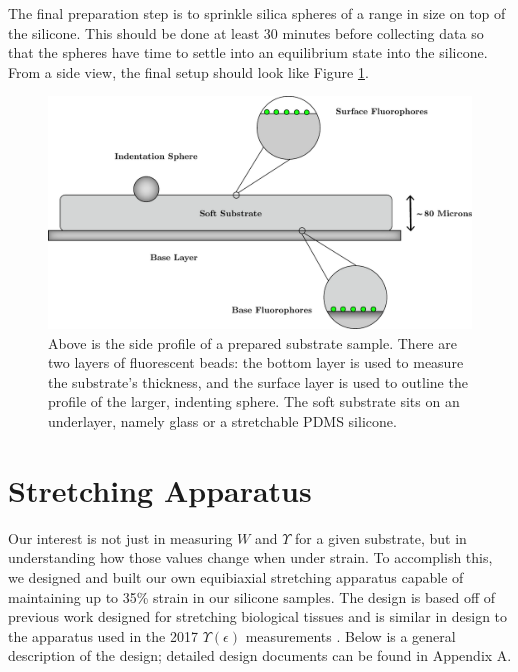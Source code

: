 The final preparation step is to sprinkle silica spheres of a range in size on top of the silicone. This should be done at least 30 minutes before collecting data so that the spheres have time to settle into an equilibrium state into the silicone. From a side view, the final setup should look like Figure \ref{fig:substrategraphic}.
\begin{figure}[h!]
	\centering
	\includegraphics[width=.85\linewidth]{Chapters/Figures/substrate_graphic_new}
	\caption[Prepared Substrate Profile]{Above is the side profile of a prepared substrate sample. There are two layers of fluorescent beads: the bottom layer is used to measure the substrate's thickness, and the surface layer is used to outline the profile of the larger, indenting sphere. The soft substrate sits on an underlayer, namely glass or a stretchable PDMS silicone.}
	\label{fig:substrategraphic}
\end{figure}


\section{Stretching Apparatus}
Our interest is not just in  measuring $W$ and $\Upsilon$ for a given substrate, but in understanding how those values change when under strain. To accomplish this, we designed and built our own equibiaxial stretching apparatus capable of maintaining up to 35\% strain in our silicone samples. The design is based off of previous work designed for stretching biological tissues \cite{na2008time} and is similar in design to the apparatus used in the 2017 $\Upsilon(\epsilon)$ measurements \cite{xu2017direct}. Below is a general description of the design; detailed design documents can be found in Appendix A.

